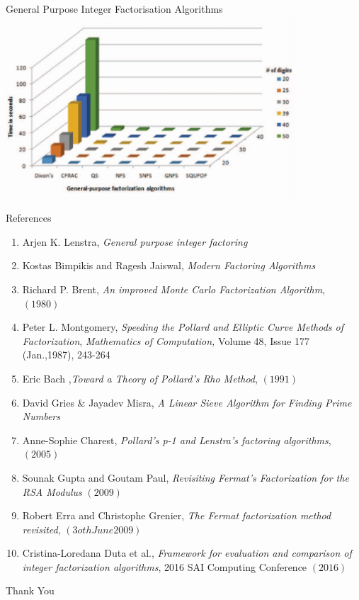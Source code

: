 \documentclass{beamer}
\begin{document}
\begin{frame}{General Purpose Integer Factorisation Algorithms}
\includegraphics[height=6.8cm]{Comparison-1.png}
\centering
\end{frame}



\begin{frame}{References}
    \begin{enumerate}
        \item Arjen K. Lenstra, \emph{General purpose integer factoring}
        \item Kostas Bimpikis and Ragesh Jaiswal, \emph{Modern Factoring Algorithms}
        \item Richard P. Brent, \emph{An improved Monte Carlo Factorization Algorithm}, $\left( 1980\right)$ 
        \item Peter L. Montgomery, \emph{Speeding the Pollard and Elliptic Curve Methods of Factorization}, \emph{Mathematics of Computation,} Volume 48, Issue 177 (Jan.,1987), 243-264
        \item Eric Bach ,\emph{Toward a Theory of Pollard's Rho Method}, $\left( 1991\right)$
        \item David Gries \& Jayadev Misra, \emph{A Linear Sieve
    Algorithm for Finding Prime Numbers }
        \item Anne-Sophie Charest, \emph{Pollard’s p-1 and Lenstra’s factoring
        algorithms}, $\left( 2005\right)$
        \item Sounak Gupta and Goutam Paul, \emph{Revisiting Fermat’s Factorization
        for the RSA Modulus} $\left( 2009\right)$
        \item Robert Erra and Christophe Grenier, \emph{The Fermat factorization method revisited}, $\left( 3oth June 2009\right)$
        \item Cristina-Loredana Duta et al., \emph{Framework for evaluation and comparison of integer factorization algorithms}, 2016 SAI Computing Conference $\left( 2016\right)$
    \end{enumerate}      
\end{frame}

\begin{frame}
\huge{\centerline{Thank You}}
\end{frame}
\end{document}
